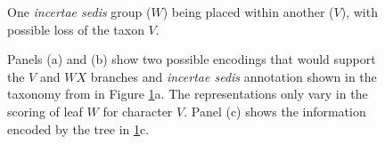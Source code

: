 \documentclass[english]{article}
\newcommand{\lyxdot}{.}
\begin{document}
\begin{figure}
\caption{\label{fig:Placing-one-incertae}
One \emph{incertae sedis} group ($W$) being placed within another ($V$), with possible
loss of the taxon $V$.}
\end{figure}

\begin{figure}
\caption{\label{fig:Placing-one-incertae-MRP}
Panels (a) and (b) show two possible encodings that would support the $V$ and $WX$ branches and \emph{incertae sedis}
annotation shown in the taxonomy from in Figure \ref{fig:Placing-one-incertae}a.
The representations only vary in the scoring of leaf $W$ for character $V$. Panel (c) shows the information encoded by the tree in \ref{fig:Placing-one-incertae}c. }
\end{figure}
\end{document}
